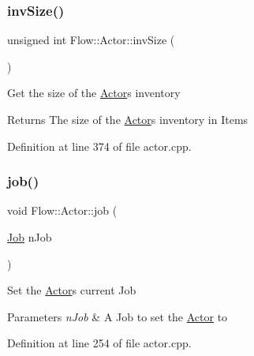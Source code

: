 \hypertarget{class_flow_1_1_actor_a6bc972a1ad28bbdb4b30f73779a1f78d}{}\label{class_flow_1_1_actor_a6bc972a1ad28bbdb4b30f73779a1f78d} 
\subsubsection{\texorpdfstring{inv\+Size()}{invSize()}}
{\footnotesize\ttfamily unsigned int Flow\+::\+Actor\+::inv\+Size (\begin{DoxyParamCaption}{ }\end{DoxyParamCaption})}

Get the size of the \hyperlink{class_flow_1_1_actor}{Actor}\textquotesingle{}s inventory \begin{DoxyReturn}{Returns}
The size of the \hyperlink{class_flow_1_1_actor}{Actor}\textquotesingle{}s inventory in Items 
\end{DoxyReturn}


Definition at line 374 of file actor.\+cpp.

\hypertarget{class_flow_1_1_actor_ac107aa0995c0532286dea215ef912cc5}{}\label{class_flow_1_1_actor_ac107aa0995c0532286dea215ef912cc5} 
\subsubsection{\texorpdfstring{job()}{job()}\hspace{0.1cm}{\footnotesize\ttfamily [1/2]}}
{\footnotesize\ttfamily void Flow\+::\+Actor\+::job (\begin{DoxyParamCaption}\item[{\hyperlink{namespace_flow_a05bb774db920847e46f3779aaef1b07b}{Job}}]{n\+Job }\end{DoxyParamCaption})}

Set the \hyperlink{class_flow_1_1_actor}{Actor}\textquotesingle{}s current Job 
\begin{DoxyParams}{Parameters}
{\em n\+Job} & A Job to set the \hyperlink{class_flow_1_1_actor}{Actor} to \\
\hline
\end{DoxyParams}


Definition at line 254 of file actor.\+cpp.

\hypertarget{class_flow_1_1_actor_aac6046fc99b742a2307084b0b366c2ed}{}\label{class_flow_1_1_actor_aac6046fc99b742a2307084b0b366c2ed} 
